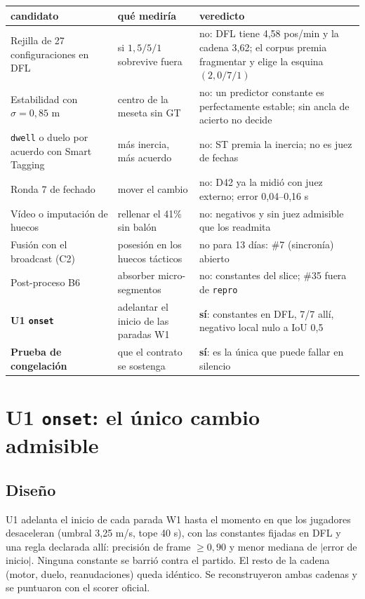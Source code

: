 \documentclass[11pt,a4paper]{article}
\begin{document}
\begin{table}[h]
\centering
\small
\begin{tabular}{p{4.3cm}p{5.1cm}p{5.0cm}}
\toprule
candidato & qué mediría & veredicto \\
\midrule
Rejilla de 27 configuraciones en DFL & si $1{,}5/5/1$ sobrevive fuera & no: DFL tiene 4,58 pos/min y la cadena 3,62; el corpus premia fragmentar y elige la esquina $(2{,}0/7/1)$ \\
Estabilidad con $\sigma=0{,}85$ m & centro de la meseta sin GT & no: un predictor constante es perfectamente estable; sin ancla de acierto no decide \\
\texttt{dwell} o duelo por acuerdo con Smart Tagging & más inercia, más acuerdo & no: ST premia la inercia; no es juez de fechas \\
Ronda 7 de fechado & mover el cambio & no: D42 ya la midió con juez externo; error 0,04--0,16 s \\
Vídeo o imputación de huecos & rellenar el 41\% sin balón & no: negativos y sin juez admisible que los readmita \\
Fusión con el broadcast (C2) & posesión en los huecos tácticos & no para 13 días: \#7 (sincronía) abierto \\
Post-proceso B6 & absorber micro-segmentos & no: constantes del slice; \#35 fuera de \texttt{repro} \\
\textbf{U1 \texttt{onset}} & adelantar el inicio de las paradas W1 & \textbf{sí}: constantes en DFL, 7/7 allí, negativo local nulo a IoU 0,5 \\
\textbf{Prueba de congelación} & que el contrato se sostenga & \textbf{sí}: es la única que puede fallar en silencio \\
\bottomrule
\end{tabular}
\end{table}

\section{U1 \texttt{onset}: el único cambio admisible}

\subsection{Diseño}

U1 adelanta el inicio de cada parada W1 hasta el momento en que los jugadores desaceleran
(umbral 3,25 m/s, tope 40 s), con las constantes fijadas en DFL y una regla declarada allí:
precisión de frame $\geq 0{,}90$ y menor mediana de $|$error de inicio$|$. Ninguna constante se
barrió contra el partido. El resto de la cadena (motor, duelo, reanudaciones) queda idéntico. Se
reconstruyeron ambas cadenas y se puntuaron con el scorer oficial.
\end{document}
